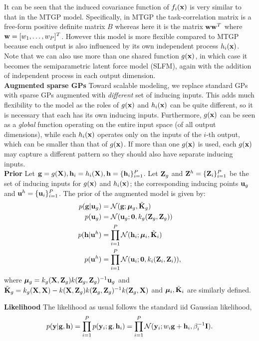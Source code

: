 \documentclass{article} %
\begin{document}
\noindent It can be seen that the induced covariance function of $f_i(\mathbf{x})$ is very similar to that in the MTGP model.
Specifically, in MTGP the task-correlation matrix is a free-form positive definite matrix $B$ whereas here it is the matrix $\mathbf{w} \mathbf{w}^T$ where $\mathbf{w} = [w_1, \hdots, w_P]^T$.
However this model is more flexible compared to MTGP because each output is also influenced by its own independent process $h_i(\mathbf{x})$.
Note that we can also use more than one shared function $g(\mathbf{x})$, in which case it becomes the semiparametric latent force model (SLFM), again with the addition of independent process in each output dimension. \\

\noindent 
\textbf{Augmented sparse GPs}
Toward scalable modeling, we replace standard GPs with sparse GPs augmented with \textit{different} set of inducing inputs.
This adds much flexibility to the model as the roles of $g(\mathbf{x})$ and $h_i(\mathbf{x})$ can be quite different, so it is necessary that each has its own inducing inputs.
Furthermore, $g(\mathbf{x})$ can be seen as a \textit{global} function operating on the entire input space (of all output dimensions), while each $h_i(\mathbf{x})$ operates only on the inputs of the $i$-th output, which can be smaller than that of $g(\mathbf{x})$.
If more than one $g(\mathbf{x})$ is used, each $g(\mathbf{x})$ may capture a different pattern so they should also have separate inducing inputs. \\

\noindent
\textbf{Prior}
\newcommand{\Zg}{\Z_g}
\newcommand{\Zi}{\Z_i}
Let $\mathbf{g} = g(\mathbf{X}), \mathbf{h}_i = h_i(\mathbf{X}), \mathbf{h} = \{\mathbf{h}_i \}_{i=1}^P$. Let $\Zg$ and $\mat{Z}^h = \{\Zi \}_{i=1}^P$ be the set of inducing inputs for $g(\mathbf{x})$ and $h_i(\mathbf{x})$; the corresponding inducing points $\mathbf{u}_g$ and $\mathbf{u}^h = \{\mathbf{u}_i \}_{i=1}^P$.
The prior of the augmented model is given by:
\begin{align}
p(\g | \u_g) &= \Normal(\g; \BigMu_g, \tilde{\K}_g )\\
p(\u_g) &= \Normal(\u_g; \vec{0}, k_g(\Zg, \Zg)) \\
p(\h | \u^h) &= \prod_{i=1}^P \Normal(\h_i; \BigMu_i, \tilde{\K}_i)\\
p(\u^h) &= \prod_{i=1}^P \Normal(\u_i; \vec{0}, k_i(\Zi, \Zi)),
\end{align}
where $\BigMu_g = k_g(\X,\Zg)k(\Zg,\Zg)^{-1}\u_g$ and $\tilde{\K}_g = k_g(\X,\X) - k(\X,\Zg)k(\Zg,\Zg)^{-1}k(\Zg,\X)$ and $\boldsymbol{\mu}_i, \tilde{\mathbf{K}}_i$ are similarly defined.

\noindent
\textbf{Likelihood}
The likelihood as usual follows the standard iid Gaussian likelihood,
\begin{align}
p(\mathbf{y} | \mathbf{g}, \mathbf{h} ) = \prod_{i=1}^P p( \mathbf{y}_i ; \mathbf{g}, \mathbf{h}_i) = \prod_{i=1}^P \mathcal{N}( \mathbf{y}_i ; w_i \mathbf{g} + \mathbf{h}_i, \beta_i^{-1} \mathbf{I}).
\end{align}
\end{document}
